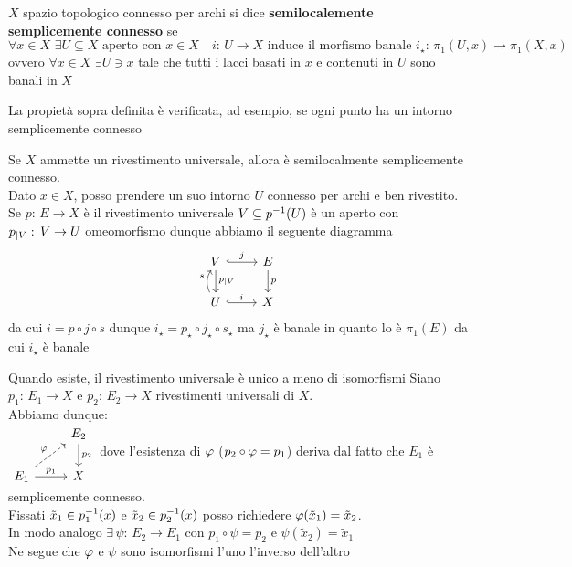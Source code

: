 \newpage
\begin{defn}\bianco 
$X$ spazio topologico connesso per archi si dice \textbf{semilocalemente semplicemente connesso} se 
$$\forall x \in X\, \, \exists U \subseteq X \text{ aperto  con } x \in X \quad i:\, U \to X \text{ induce il morfismo banale } i_\star:\, \pi_1(U,x) \to \pi_1(X,x)$$
ovvero $\forall x \in X \, \, \exists U\ni x$ tale che tutti i lacci basati in $x$ e contenuti in $U$ sono banali in $X$ 
\end{defn}
\begin{oss}La propiet\`a sopra definita \`e verificata, ad esempio, se ogni punto ha un intorno semplicemente connesso
\end{oss}
\begin{oss}Se $X$ ammette un rivestimento universale, allora \`e semilocalmente semplicemente connesso.\\
Dato $x\in X$, posso prendere un suo intorno $U$ connesso per archi e ben rivestito.\\
Se $p:\, E \to X$ \`e il rivestimento universale $V\subseteq p^{-1}(U)$ \`e un aperto con $p_{\vert V} :\, V \to U $ omeomorfismo dunque abbiamo il seguente diagramma
$$ \begin{tikzcd}
V \arrow{d}{\ris p V} \arrow[hook,r,"j"] & E \arrow[d, "p"] \\
U \arrow[hook, r ,"i"] \arrow[bend left, u,"s"]& X 
\end{tikzcd}$$
da cui $i=p\circ j \circ s $ dunque $i_\star = p_\star \circ j_\star \circ s_\star$ ma $j_\star$ \`e banale in quanto lo \`e $\pi_1(E)$ da cui $i_\star$ \`e banale 
\end{oss}

\begin{lem}Quando esiste, il rivestimento universale \`e unico a meno di isomorfismi
\proof Siano $p_1:\, E_1 \to X$ e $p_2:\, E_2 \to X$ rivestimenti universali di $X$.\\
Abbiamo dunque:\\
$ \begin{tikzcd}
& E_2 \arrow{d}{p_2} \\
E_1 \arrow[dashed]{ru}{\vp} \arrow{r}{p_1} & X 
\end{tikzcd}$
dove l'esistenza di $\varphi$ ($p_2 \circ \varphi = p_1$) deriva dal fatto che  $E_1$ \`e semplicemente connesso.\\
Fissati $\tilde{x}_1\in p_1^{-1}(x)$ e $\tilde{x}_2 \in p_2^{-1}(x)$ posso richiedere $\varphi(\tilde{x}_1) =\tilde{x}_2$.\\
In modo analogo $\exists \, \psi:\, E_2 \to E_1$ con $p_1\circ \psi=p_2$ e $\psi(\tilde{x}_2) =\tilde{x}_1$\\
Ne segue che $\varphi $ e $\psi$ sono isomorfismi l'uno l'inverso dell'altro
\end{lem}

